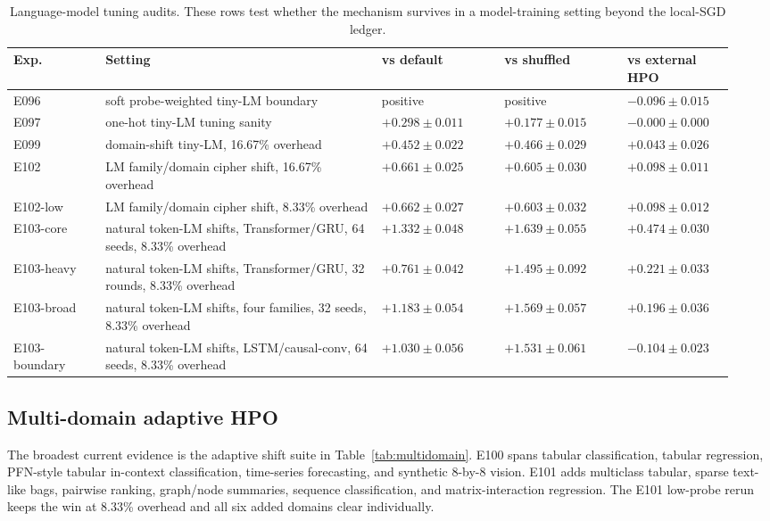 \begin{table}[t]
\centering
\small
\caption{Language-model tuning audits. These rows test whether the mechanism
survives in a model-training setting beyond the local-SGD ledger.}
\label{tab:lm}
\begin{tabular}{@{}p{0.12\linewidth}p{0.36\linewidth}p{0.16\linewidth}p{0.16\linewidth}p{0.14\linewidth}@{}}
\toprule
Exp. & Setting & vs default & vs shuffled & vs external HPO \\
\midrule
E096 & soft probe-weighted tiny-LM boundary & positive & positive & $-0.096 \pm 0.015$ \\
E097 & one-hot tiny-LM tuning sanity & $+0.298 \pm 0.011$ & $+0.177 \pm 0.015$ & $-0.000 \pm 0.000$ \\
E099 & domain-shift tiny-LM, 16.67\% overhead & $+0.452 \pm 0.022$ & $+0.466 \pm 0.029$ & $+0.043 \pm 0.026$ \\
E102 & LM family/domain cipher shift, 16.67\% overhead & $+0.661 \pm 0.025$ & $+0.605 \pm 0.030$ & $+0.098 \pm 0.011$ \\
E102-low & LM family/domain cipher shift, 8.33\% overhead & $+0.662 \pm 0.027$ & $+0.603 \pm 0.032$ & $+0.098 \pm 0.012$ \\
E103-core & natural token-LM shifts, Transformer/GRU, 64 seeds, 8.33\% overhead & $+1.332 \pm 0.048$ & $+1.639 \pm 0.055$ & $+0.474 \pm 0.030$ \\
E103-heavy & natural token-LM shifts, Transformer/GRU, 32 rounds, 8.33\% overhead & $+0.761 \pm 0.042$ & $+1.495 \pm 0.092$ & $+0.221 \pm 0.033$ \\
E103-broad & natural token-LM shifts, four families, 32 seeds, 8.33\% overhead & $+1.183 \pm 0.054$ & $+1.569 \pm 0.057$ & $+0.196 \pm 0.036$ \\
E103-boundary & natural token-LM shifts, LSTM/causal-conv, 64 seeds, 8.33\% overhead & $+1.030 \pm 0.056$ & $+1.531 \pm 0.061$ & $-0.104 \pm 0.023$ \\
\bottomrule
\end{tabular}
\end{table}

\subsection{Multi-domain adaptive HPO}

The broadest current evidence is the adaptive shift suite in
Table~\ref{tab:multidomain}. E100 spans tabular classification, tabular
regression, PFN-style tabular in-context classification, time-series
forecasting, and synthetic 8-by-8 vision. E101 adds multiclass tabular,
sparse text-like bags, pairwise ranking, graph/node summaries, sequence
classification, and matrix-interaction regression. The E101 low-probe rerun
keeps the win at 8.33\% overhead and all six added domains clear individually.

